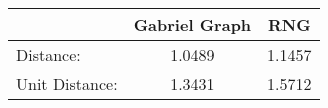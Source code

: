 \begin{tabular}{l|c|c|}
 & Gabriel Graph & RNG\\
\hline
Distance: & 1.0489 & 1.1457\\
Unit Distance: & 1.3431 & 1.5712\\
\end{tabular}